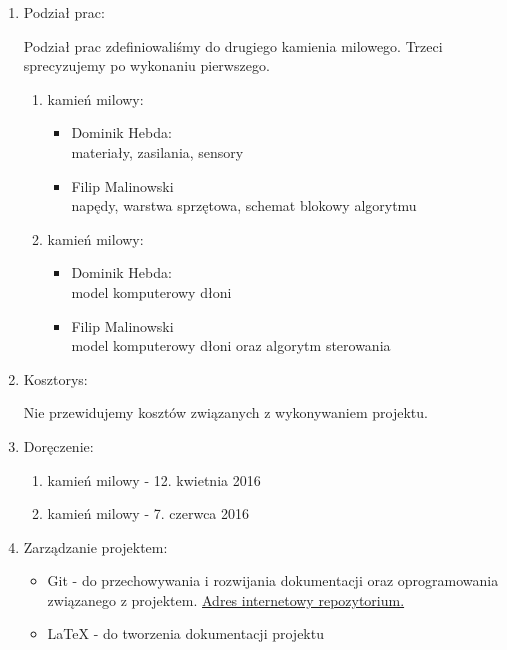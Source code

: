 \documentclass[a4paper]{article}
\begin{document}
\begin{enumerate}
\newpage

\item Podział prac:

Podział prac zdefiniowaliśmy do drugiego kamienia milowego. Trzeci sprecyzujemy po wykonaniu pierwszego.
\begin{enumerate}[I]
\item kamień milowy:
\begin{itemize}
\item Dominik Hebda: \\
materiały, zasilania, sensory
\item Filip Malinowski \\
napędy, warstwa sprzętowa, schemat blokowy algorytmu
\end{itemize}
\item kamień milowy:
\begin{itemize}
\item Dominik Hebda: \\
model komputerowy dłoni
\item Filip Malinowski \\
model komputerowy dłoni oraz algorytm sterowania
\end{itemize}
\end{enumerate}

\item Kosztorys:

Nie przewidujemy kosztów związanych z wykonywaniem projektu.

\item Doręczenie:
\begin{enumerate}[I]
\item kamień milowy - 12. kwietnia 2016
\item kamień milowy - 7. czerwca 2016
\end{enumerate}

\item Zarządzanie projektem:
\begin{itemize}
\item Git - do przechowywania i rozwijania dokumentacji oraz oprogramowania związanego z projektem.
\href{https://github.com/hizonglol/roboty_mobilne-2016}{Adres internetowy repozytorium.}
\item LaTeX - do tworzenia dokumentacji projektu
\end{itemize}
\end{enumerate}
\end{document}
